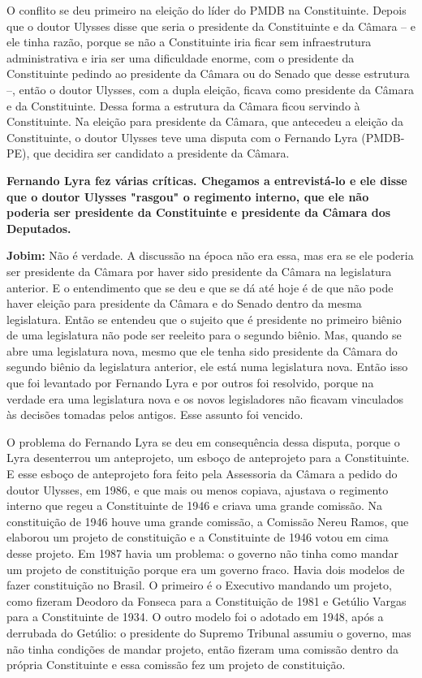 O conflito se deu primeiro na eleição do líder do PMDB na Constituinte.
Depois que o doutor Ulysses disse que seria o presidente da Constituinte
e da Câmara -- e ele tinha razão, porque se não a Constituinte iria
ficar sem infraestrutura administrativa e iria ser uma dificuldade
enorme, com o presidente da Constituinte pedindo ao presidente da Câmara
ou do Senado que desse estrutura --, então o doutor Ulysses, com a dupla
eleição, ficava como presidente da Câmara e da Constituinte. Dessa forma
a estrutura da Câmara ficou servindo à Constituinte. Na eleição para
presidente da Câmara, que antecedeu a eleição da Constituinte, o doutor
Ulysses teve uma disputa com o Fernando Lyra (PMDB-PE), que decidira ser
candidato a presidente da Câmara.

\textbf{Fernando Lyra fez várias críticas. Chegamos a entrevistá-lo e
ele disse que o doutor Ulysses "rasgou" o regimento interno, que ele não
poderia ser presidente da Constituinte e presidente da Câmara dos
Deputados.}

\textbf{Jobim:} Não é verdade. A discussão na época não era essa, mas
era se ele poderia ser presidente da Câmara por haver sido presidente da
Câmara na legislatura anterior. E o entendimento que se deu e que se dá
até hoje é de que não pode haver eleição para presidente da Câmara e do
Senado dentro da mesma legislatura. Então se entendeu que o sujeito que
é presidente no primeiro biênio de uma legislatura não pode ser reeleito
para o segundo biênio. Mas, quando se abre uma legislatura nova, mesmo
que ele tenha sido presidente da Câmara do segundo biênio da legislatura
anterior, ele está numa legislatura nova. Então isso que foi levantado
por Fernando Lyra e por outros foi resolvido, porque na verdade era uma
legislatura nova e os novos legisladores não ficavam vinculados às
decisões tomadas pelos antigos. Esse assunto foi vencido.

O problema do Fernando Lyra se deu em consequência dessa disputa, porque
o Lyra desenterrou um anteprojeto, um esboço de anteprojeto para a
Constituinte. E esse esboço de anteprojeto fora feito pela Assessoria da
Câmara a pedido do doutor Ulysses, em 1986, e que mais ou menos copiava,
ajustava o regimento interno que regeu a Constituinte de 1946 e criava
uma grande comissão. Na constituição de 1946 houve uma grande comissão,
a Comissão Nereu Ramos, que elaborou um projeto de constituição e a
Constituinte de 1946 votou em cima desse projeto. Em 1987 havia um
problema: o governo não tinha como mandar um projeto de constituição
porque era um governo fraco. Havia dois modelos de fazer constituição no
Brasil. O primeiro é o Executivo mandando um projeto, como fizeram
Deodoro da Fonseca para a Constituição de 1981 e Getúlio Vargas para a
Constituinte de 1934. O outro modelo foi o adotado em 1948, após a
derrubada do Getúlio: o presidente do Supremo Tribunal assumiu o
governo, mas não tinha condições de mandar projeto, então fizeram uma
comissão dentro da própria Constituinte e essa comissão fez um projeto
de constituição.

